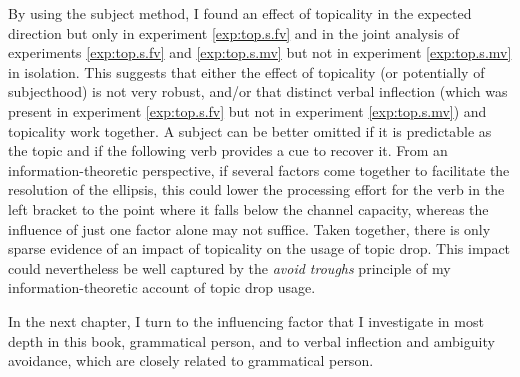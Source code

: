 By using the subject method, I found an effect of topicality in the expected direction but only in experiment \ref*{exp:top.s.fv} and in the joint analysis of experiments \ref*{exp:top.s.fv} and \ref*{exp:top.s.mv} but not in experiment \ref*{exp:top.s.mv} in isolation.
This suggests that either the effect of topicality (or potentially of subjecthood) is not very robust, and/or that distinct verbal inflection (which was present in experiment \ref*{exp:top.s.fv} but not in experiment \ref*{exp:top.s.mv}) and topicality work together.
A subject can be better omitted if it is predictable  as the topic and if the following verb provides a cue to recover it. 
From an information-theoretic perspective, if several factors come together to facilitate the resolution of the ellipsis, this could lower the processing effort  for the verb in the left bracket to the point where it falls below the channel capacity,  whereas the influence of just one factor alone may not suffice.
Taken together, there is only sparse evidence of an impact of topicality on the usage of topic drop.
This impact could nevertheless be well captured by the \textit{avoid troughs} principle of my information-theoretic account of topic drop usage.

In the next chapter, I turn to the influencing factor that I investigate in most depth in this book, grammatical person, and to verbal inflection and ambiguity avoidance, which are closely related to grammatical person.
